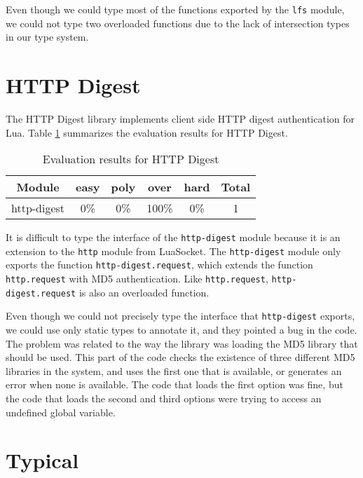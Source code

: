 Even though we could type most of the functions exported by the
\texttt{lfs} module, we could not type two overloaded functions
due to the lack of intersection types in our type system.

\section{HTTP Digest}

The HTTP Digest library implements client side HTTP digest authentication for Lua.
Table \ref{tab:evalhttpdigest} summarizes the evaluation results for HTTP Digest.

\begin{table}[!ht]
\begin{center}
\begin{tabular}{|c|c|c|c|c|c|}
\hline
\textbf{Module} & \textbf{easy} & \textbf{poly} & \textbf{over} & \textbf{hard} & \textbf{Total} \\
\hline
http-digest & 0\% & 0\% & 100\% & 0\% & 1 \\ %
\hline
\end{tabular}
\end{center}
\caption{Evaluation results for HTTP Digest}
\label{tab:evalhttpdigest}
\end{table}

It is difficult to type the interface of the \texttt{http-digest} module
because it is an extension to the \texttt{http} module from LuaSocket.
The \texttt{http-digest} module only exports the function
\texttt{http-digest.request}, which extends the function
\texttt{http.request} with MD5 authentication.
Like \texttt{http.request}, \texttt{http-digest.request}
is also an overloaded function.

Even though we could not precisely type the interface that \texttt{http-digest}
exports, we could use only static types to annotate it, and they pointed a bug
in the code.
The problem was related to the way the library was loading the MD5 library
that should be used. 
This part of the code checks the existence of three different MD5 libraries
in the system, and uses the first one that is available, or generates an
error when none is available.
The code that loads the first option was fine, but the code that loads the
second and third options were trying to access an undefined global variable.

\section{Typical}

